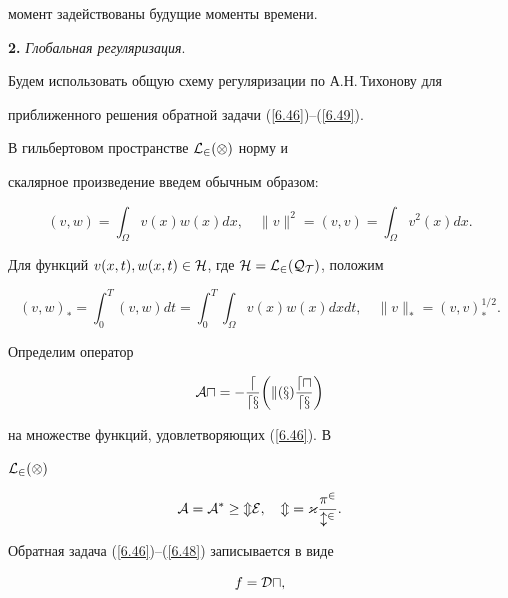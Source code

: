 момент задействованы будущие моменты времени.


\medskip





{\bf 2.} {\it Глобальная регуляризация}.


Будем использовать общую схему регуляризации по А.Н.\,Ти\-хо\-но\-ву для


приближенного решения обратной задачи (\ref{6.46})--(\ref{6.49}).





В гильбертовом пространстве $\cal{L}_2(\Omega)$ норму и


скалярное произведение введем обычным образом:


$$


(v,w) = \int_{\Omega} v(x) w(x) d x ,


\quad


\|v\|^2 = (v,v) = \int_{\Omega} v^2(x) d x .


$$


Для функций $v(x,t), w(x,t) \in \cal{H}$, где $\cal{H} =


\cal{L}_2(Q_{T})$, положим


$$


(v,w)_* = \int_0^T (v,w) dt = \int_0^T \int_{\Omega} v(x) w(x) d x  dt,


\quad \|v\|_{*} = (v,v)_*^{1/2} .


$$


Определим оператор


$$


\cal{A} u =  - \frac{d}{dx} \bigg ( k(x) \frac{du}{dx} \bigg )


$$


на множестве функций, удовлетворяющих (\ref{6.46}). В


$\cal{L}_2(\Omega)$


$$


\cal{A} = \cal{A}^* \ge m E,


\quad m = \varkappa \frac{\pi^2}{l^2} .


$$





Обратная задача (\ref{6.46})--(\ref{6.48}) записывается в виде


\begin{equation}\label{6.50}


f =\cal{D} u ,


\end{equation}


